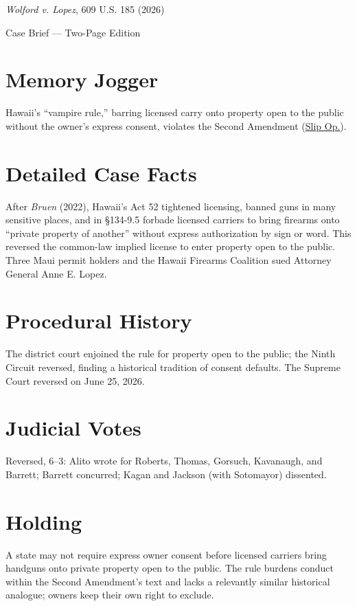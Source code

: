 \documentclass[12pt]{article}
\begin{document}
\begin{center}
{\LARGE \textit{Wolford v. Lopez}, 609 U.S. 185 (2026)\par}
\vspace{0.5em}
{\large Case Brief --- Two-Page Edition\par}
\end{center}

\section{Memory Jogger}
Hawaii's ``vampire rule,'' barring licensed carry onto property open to the public without the owner's express consent, violates the Second Amendment (\href{https://www.supremecourt.gov/opinions/25pdf/24-1046_nmio.pdf}{Slip Op.}).

\section{Detailed Case Facts}
After \textit{Bruen} (2022), Hawaii's Act 52 tightened licensing, banned guns in many sensitive places, and in \S{}134-9.5 forbade licensed carriers to bring firearms onto ``private property of another'' without express authorization by sign or word. This reversed the common-law implied license to enter property open to the public. Three Maui permit holders and the Hawaii Firearms Coalition sued Attorney General Anne E. Lopez.

\section{Procedural History}
The district court enjoined the rule for property open to the public; the Ninth Circuit reversed, finding a historical tradition of consent defaults. The Supreme Court reversed on June 25, 2026.

\section{Judicial Votes}
Reversed, 6--3: Alito wrote for Roberts, Thomas, Gorsuch, Kavanaugh, and Barrett; Barrett concurred; Kagan and Jackson (with Sotomayor) dissented.

\section{Holding}
A state may not require express owner consent before licensed carriers bring handguns onto private property open to the public. The rule burdens conduct within the Second Amendment's text and lacks a relevantly similar historical analogue; owners keep their own right to exclude.
\end{document}
